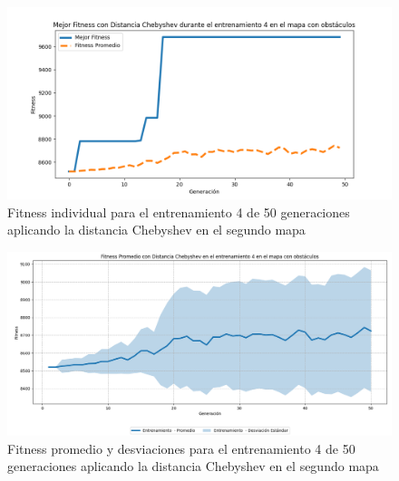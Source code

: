 \documentclass[conference]{IEEEtran}
\begin{document}
\begin{figure}[H]
    \centering
    \includegraphics[width=0.9 \linewidth]{Chebyshev/Mapa2/Fitness_4_Map2_Cheby_50Gen.png}
    \caption{Fitness individual para el entrenamiento 4 de 50 generaciones aplicando la distancia Chebyshev en el segundo mapa}
    \label{fig:cheb_4_50_m2}
\end{figure}
\begin{figure}[H]
    \centering
    \includegraphics[width=0.9 \linewidth]{Chebyshev/Mapa2/Fitness_4_Map2_Cheby_50Gen_Sombra.png}
    \caption{Fitness promedio y desviaciones para el entrenamiento 4 de 50 generaciones aplicando la distancia Chebyshev en el segundo mapa}
    \label{fig:cheb_4_50_sombra_m2}
\end{figure}
\end{document}
